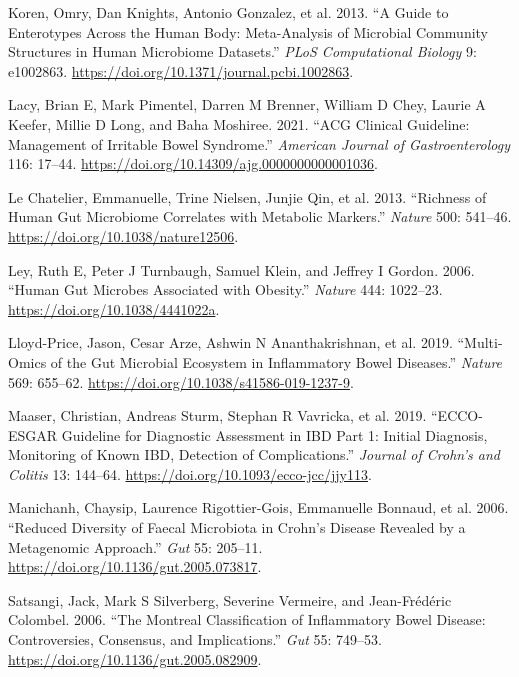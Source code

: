 \documentclass[
  11pt,
]{article}
\newlength{\cslhangindent}
\newenvironment{CSLReferences}[2] %
 {\begin{list}{}{%
  \setlength{\itemindent}{0pt}
  \setlength{\leftmargin}{0pt}
  \setlength{\parsep}{0pt}
  \ifodd #1
   \setlength{\leftmargin}{\cslhangindent}
   \setlength{\itemindent}{-1\cslhangindent}
  \fi
  \setlength{\itemsep}{#2\baselineskip}}}
 {\end{list}}
\begin{document}
\begin{CSLReferences}{1}{0}
Koren, Omry, Dan Knights, Antonio Gonzalez, et al. 2013. {``A Guide to
Enterotypes Across the Human Body: Meta-Analysis of Microbial Community
Structures in Human Microbiome Datasets.''} \emph{PLoS Computational
Biology} 9: e1002863.
\url{https://doi.org/10.1371/journal.pcbi.1002863}.

Lacy, Brian E, Mark Pimentel, Darren M Brenner, William D Chey, Laurie A
Keefer, Millie D Long, and Baha Moshiree. 2021. {``{ACG} Clinical
Guideline: Management of Irritable Bowel Syndrome.''} \emph{American
Journal of Gastroenterology} 116: 17--44.
\url{https://doi.org/10.14309/ajg.0000000000001036}.

Le Chatelier, Emmanuelle, Trine Nielsen, Junjie Qin, et al. 2013.
{``Richness of Human Gut Microbiome Correlates with Metabolic
Markers.''} \emph{Nature} 500: 541--46.
\url{https://doi.org/10.1038/nature12506}.

Ley, Ruth E, Peter J Turnbaugh, Samuel Klein, and Jeffrey I Gordon.
2006. {``Human Gut Microbes Associated with Obesity.''} \emph{Nature}
444: 1022--23. \url{https://doi.org/10.1038/4441022a}.

Lloyd-Price, Jason, Cesar Arze, Ashwin N Ananthakrishnan, et al. 2019.
{``Multi-Omics of the Gut Microbial Ecosystem in Inflammatory Bowel
Diseases.''} \emph{Nature} 569: 655--62.
\url{https://doi.org/10.1038/s41586-019-1237-9}.

Maaser, Christian, Andreas Sturm, Stephan R Vavricka, et al. 2019.
{``{ECCO-ESGAR} Guideline for Diagnostic Assessment in {IBD} Part 1:
Initial Diagnosis, Monitoring of Known {IBD}, Detection of
Complications.''} \emph{Journal of Crohn's and Colitis} 13: 144--64.
\url{https://doi.org/10.1093/ecco-jcc/jjy113}.

Manichanh, Chaysip, Laurence Rigottier-Gois, Emmanuelle Bonnaud, et al.
2006. {``Reduced Diversity of Faecal Microbiota in {C}rohn's Disease
Revealed by a Metagenomic Approach.''} \emph{Gut} 55: 205--11.
\url{https://doi.org/10.1136/gut.2005.073817}.

Satsangi, Jack, Mark S Silverberg, Severine Vermeire, and Jean-Frédéric
Colombel. 2006. {``The Montreal Classification of Inflammatory Bowel
Disease: Controversies, Consensus, and Implications.''} \emph{Gut} 55:
749--53. \url{https://doi.org/10.1136/gut.2005.082909}.


\end{CSLReferences}
\end{document}
